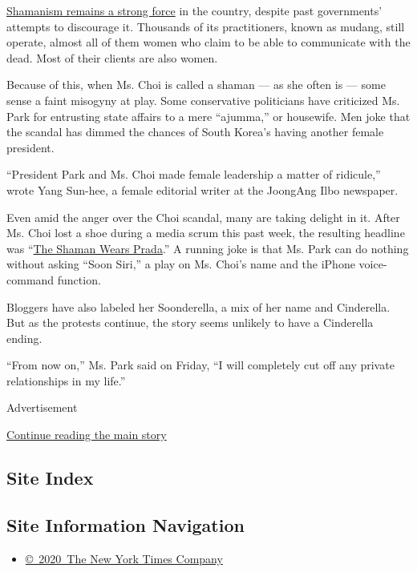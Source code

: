\href{http://www.nytimes3xbfgragh.onion/2007/07/07/world/asia/07korea.html}{Shamanism
remains a strong force} in the country, despite past governments'
attempts to discourage it. Thousands of its practitioners, known as
mudang, still operate, almost all of them women who claim to be able to
communicate with the dead. Most of their clients are also women.

Because of this, when Ms. Choi is called a shaman --- as she often is
--- some sense a faint misogyny at play. Some conservative politicians
have criticized Ms. Park for entrusting state affairs to a mere
``ajumma,'' or housewife. Men joke that the scandal has dimmed the
chances of South Korea's having another female president.

``President Park and Ms. Choi made female leadership a matter of
ridicule,'' wrote Yang Sun-hee, a female editorial writer at the
JoongAng Ilbo newspaper.

Even amid the anger over the Choi scandal, many are taking delight in
it. After Ms. Choi lost a shoe during a media scrum this past week, the
resulting headline was
``\href{http://www.kyeonggi.com/?mod=news\&act=articleView\&idxno=1262640}{The
Shaman Wears Prada}.'' A running joke is that Ms. Park can do nothing
without asking ``Soon Siri,'' a play on Ms. Choi's name and the iPhone
voice-command function.

Bloggers have also labeled her Soonderella, a mix of her name and
Cinderella. But as the protests continue, the story seems unlikely to
have a Cinderella ending.

``From now on,'' Ms. Park said on Friday, ``I will completely cut off
any private relationships in my life.''

Advertisement

\protect\hyperlink{after-bottom}{Continue reading the main story}

\hypertarget{site-index}{%
\subsection{Site Index}\label{site-index}}

\hypertarget{site-information-navigation}{%
\subsection{Site Information
Navigation}\label{site-information-navigation}}

\begin{itemize}
\tightlist
\item
  \href{https://help.nytimes3xbfgragh.onion/hc/en-us/articles/115014792127-Copyright-notice}{©~2020~The
  New York Times Company}
\end{itemize}

